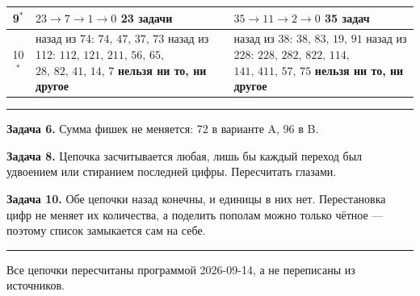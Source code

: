 \documentclass[12pt,a4paper]{article}
\begin{document}
\begin{tabular}{@{}c|p{7.6cm}|p{7.6cm}@{}}
9$^*$ & $23 \to 7 \to 1 \to 0$ \newline \textbf{23 задачи} & $35 \to 11 \to 2 \to 0$ \newline \textbf{35 задач}\\ \hline
10$^*$ & назад из 74: $74,\,47,\,37,\,73$ \newline назад из 112: $112,\,121,\,211,\,56,\,65,$ \newline $28,\,82,\,41,\,14,\,7$ \newline \textbf{нельзя ни то, ни другое} & назад из 38: $38,\,83,\,19,\,91$ \newline назад из 228: $228,\,282,\,822,\,114,$ \newline $141,\,411,\,57,\,75$ \newline \textbf{нельзя ни то, ни другое}\\
\end{tabular}

\vspace{14pt}\hrule\vspace{8pt}

\textbf{Задача 6.} Сумма фишек не меняется: 72 в варианте A, 96 в B.

\vspace{3pt}
\textbf{Задача 8.} Цепочка засчитывается любая, лишь бы каждый переход был удвоением
или стиранием последней цифры. Пересчитать глазами.

\vspace{3pt}
\textbf{Задача 10.} Обе цепочки назад конечны, и единицы в них нет. Перестановка цифр
не меняет их количества, а поделить пополам можно только чётное --- поэтому список
замыкается сам на себе.

\vspace{12pt}\hrule\vspace{5pt}
{\small Все цепочки пересчитаны программой 2026-09-14, а не переписаны из источников.}
\end{document}
